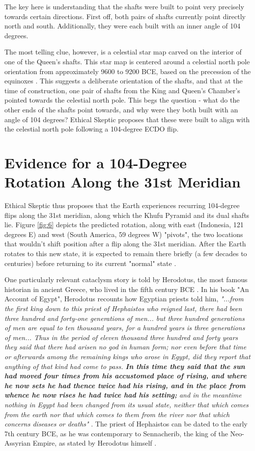 \documentclass[10pt,twocolumn,letterpaper]{article}
\begin{document}
The key here is understanding that the shafts were built to point very precisely towards certain directions. First off, both pairs of shafts currently point directly north and south. Additionally, they were each built with an inner angle of 104 degrees.

The most telling clue, however, is a celestial star map carved on the interior of one of the Queen's shafts. This star map is centered around a celestial north pole orientation from approximately 9600 to 9200 BCE, based on the precession of the equinoxes \cite{28}. This suggests a deliberate orientation of the shafts, and that at the time of construction, one pair of shafts from the King and Queen's Chamber's pointed towards the celestial north pole. This begs the question - what do the other ends of the shafts point towards, and why were they both built with an angle of 104 degrees? Ethical Skeptic proposes that these were built to align with the celestial north pole following a 104-degree ECDO flip.

\section{Evidence for a 104-Degree Rotation Along the 31st Meridian}

Ethical Skeptic thus proposes that the Earth experiences recurring 104-degree flips along the 31st meridian, along which the Khufu Pyramid and its dual shafts lie. Figure \ref{fig:6} depicts the predicted rotation, along with east (Indonesia, 121 degrees E) and west (South America, 59 degrees W) "pivots", the two locations that wouldn't shift position after a flip along the 31st meridian. After the Earth rotates to this new state, it is expected to remain there briefly (a few decades to centuries) before returning to its current "normal" state \cite{150}.

One particularly relevant cataclysm story is told by Herodotus, the most famous historian in ancient Greece, who lived in the fifth century BCE \cite{31}. In his book "An Account of Egypt", Herodotus recounts how Egyptian priests told him, \textit{"...from the first king down to this priest of Hephaistos who reigned last, there had been three hundred and forty-one generations of men... but three hundred generations of men are equal to ten thousand years, for a hundred years is three generations of men... Thus in the period of eleven thousand three hundred and forty years they said that there had arisen no god in human form; nor even before that time or afterwards among the remaining kings who arose in Egypt, did they report that anything of that kind had come to pass. \textbf{In this time they said that the sun had moved four times from his accustomed place of rising, and where he now sets he had thence twice had his rising, and in the place from whence he now rises he had twice had his setting;} and in the meantime nothing in Egypt had been changed from its usual state, neither that which comes from the earth nor that which comes to them from the river nor that which concerns diseases or deaths"} \cite{32}. The priest of Hephaistos can be dated to the early 7th century BCE, as he was contemporary to Sennacherib, the king of the Neo-Assyrian Empire, as stated by Herodotus himself \cite{32,33,34}.
\end{document}
